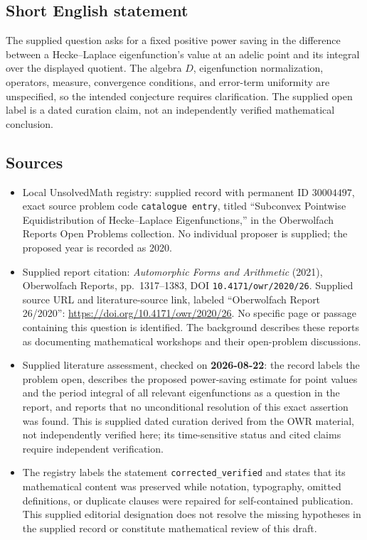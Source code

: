\documentclass[11pt]{article}
\begin{document}
\subsection{Short English statement}
The supplied question asks for a fixed positive power saving in the difference between a Hecke--Laplace eigenfunction's value at an adelic point and its integral over the displayed quotient. The algebra \(D\), eigenfunction normalization, operators, measure, convergence conditions, and error-term uniformity are unspecified, so the intended conjecture requires clarification. The supplied open label is a dated curation claim, not an independently verified mathematical conclusion.
\subsection{Sources}
\begin{itemize}
\item Local UnsolvedMath registry: supplied record with permanent ID \(30004497\), exact source problem code \texttt{catalogue entry}, titled ``Subconvex Pointwise Equidistribution of Hecke--Laplace Eigenfunctions,'' in the Oberwolfach Reports Open Problems collection. No individual proposer is supplied; the proposed year is recorded as 2020.
\item Supplied report citation: \emph{Automorphic Forms and Arithmetic} (2021), Oberwolfach Reports, pp.\ 1317--1383, DOI \texttt{10.4171/owr/2020/26}. Supplied source URL and literature-source link, labeled ``Oberwolfach Report 26/2020'': \url{https://doi.org/10.4171/owr/2020/26}. No specific page or passage containing this question is identified. The background describes these reports as documenting mathematical workshops and their open-problem discussions.
\item Supplied literature assessment, checked on \textbf{2026-08-22}: the record labels the problem open, describes the proposed power-saving estimate for point values and the period integral of all relevant eigenfunctions as a question in the report, and reports that no unconditional resolution of this exact assertion was found. This is supplied dated curation derived from the OWR material, not independently verified here; its time-sensitive status and cited claims require independent verification.
\item The registry labels the statement \texttt{corrected\_verified} and states that its mathematical content was preserved while notation, typography, omitted definitions, or duplicate clauses were repaired for self-contained publication. This supplied editorial designation does not resolve the missing hypotheses in the supplied record or constitute mathematical review of this draft.
\end{itemize}
\end{document}
